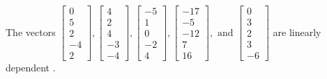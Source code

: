 \begin{exercise}
\begin{exerciseStatement}
  \end{exerciseStatement}
  \begin{exerciseAnswer}
   The vectors \(\left[\begin{array}{r}
0 \\
5 \\
2 \\
-4 \\
2
\end{array}\right] , \left[\begin{array}{r}
4 \\
2 \\
4 \\
-3 \\
-4
\end{array}\right] , \left[\begin{array}{r}
-5 \\
1 \\
0 \\
-2 \\
4
\end{array}\right] , \left[\begin{array}{r}
-17 \\
-5 \\
-12 \\
7 \\
16
\end{array}\right] , \text{ and } \left[\begin{array}{r}
0 \\
3 \\
2 \\
3 \\
-6
\end{array}\right]\) are 
  	 linearly dependent  .
  


  \end{exerciseAnswer}
\end{exercise}